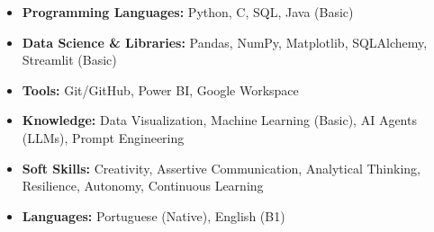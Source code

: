 \documentclass[a4paper,10pt]{article}
\begin{document}
\begin{itemize}
  \item \textbf{Programming Languages:} Python, C, SQL, Java (Basic)
  \item \textbf{Data Science \& Libraries:} Pandas, NumPy, Matplotlib, SQLAlchemy, Streamlit (Basic)
  \item \textbf{Tools:} Git/GitHub, Power BI, Google Workspace
  \item \textbf{Knowledge:} Data Visualization, Machine Learning (Basic), AI Agents (LLMs), Prompt Engineering
  \item \textbf{Soft Skills:} Creativity, Assertive Communication, Analytical Thinking, Resilience, Autonomy, Continuous Learning
  \item \textbf{Languages:} Portuguese (Native), English (B1)
\end{itemize}


\end{document}
